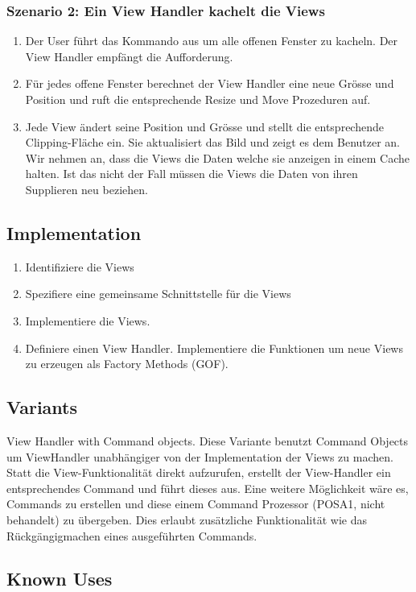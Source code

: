 \subsubsection*{Szenario 2: Ein View Handler kachelt die Views }
\begin{enumerate}
	\item Der User führt das Kommando aus um alle offenen Fenster zu kacheln. Der View Handler empfängt die Aufforderung.
	\item Für jedes offene Fenster berechnet der View Handler eine neue Grösse und Position und ruft die entsprechende Resize und Move Prozeduren auf.
	\item Jede View ändert seine Position und Grösse und stellt die entsprechende Clipping-Fläche ein. Sie aktualisiert das Bild und zeigt es dem Benutzer an. Wir nehmen an, dass die Views die Daten welche sie anzeigen in einem Cache halten. Ist das nicht der Fall müssen die Views die Daten von ihren Supplieren neu beziehen.
\end{enumerate}

\subsection*{Implementation}
\begin{enumerate}
	\item Identifiziere die Views
	\item Spezifiere eine gemeinsame Schnittstelle für die Views
	\item Implementiere die Views.
	\item Definiere einen View Handler. Implementiere die Funktionen um neue Views zu erzeugen als Factory Methods (GOF).
\end{enumerate}


\subsection*{Variants}


View Handler with Command objects. Diese Variante benutzt Command Objects um ViewHandler unabhängiger von der Implementation der Views zu machen. Statt die View-Funktionalität direkt aufzurufen, erstellt der View-Handler ein entsprechendes Command und führt dieses aus. Eine weitere Möglichkeit wäre es, Commands zu erstellen und diese einem Command Prozessor (POSA1, nicht behandelt) zu übergeben. Dies erlaubt zusätzliche Funktionalität wie das Rückgängigmachen eines ausgeführten Commands.

\subsection*{Known Uses}


